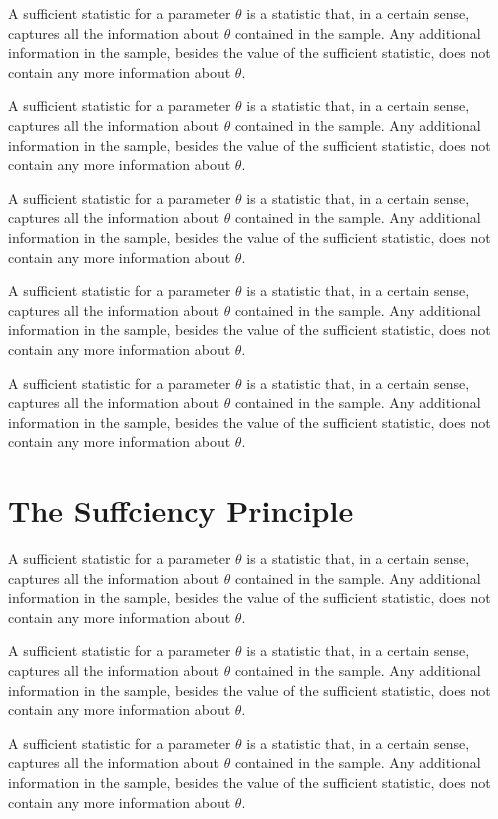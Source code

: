 A sufficient statistic for a parameter $\theta$ is a statistic that, in a certain sense, captures all the information about $\theta$ contained in the sample. Any additional information in the sample, besides the value of the sufficient statistic, does not contain any more information about $\theta$.

A sufficient statistic for a parameter $\theta$ is a statistic that, in a certain sense, captures all the information about $\theta$ contained in the sample. Any additional information in the sample, besides the value of the sufficient statistic, does not contain any more information about $\theta$.

A sufficient statistic for a parameter $\theta$ is a statistic that, in a certain sense, captures all the information about $\theta$ contained in the sample. Any additional information in the sample, besides the value of the sufficient statistic, does not contain any more information about $\theta$.

A sufficient statistic for a parameter $\theta$ is a statistic that, in a certain sense, captures all the information about $\theta$ contained in the sample. Any additional information in the sample, besides the value of the sufficient statistic, does not contain any more information about $\theta$.

A sufficient statistic for a parameter $\theta$ is a statistic that, in a certain sense, captures all the information about $\theta$ contained in the sample. Any additional information in the sample, besides the value of the sufficient statistic, does not contain any more information about $\theta$.
\section{The Suffciency Principle}

A sufficient statistic for a parameter $\theta$ is a statistic that, in a certain sense, captures all the information about $\theta$ contained in the sample. Any additional information in the sample, besides the value of the sufficient statistic, does not contain any more information about $\theta$.

A sufficient statistic for a parameter $\theta$ is a statistic that, in a certain sense, captures all the information about $\theta$ contained in the sample. Any additional information in the sample, besides the value of the sufficient statistic, does not contain any more information about $\theta$.

A sufficient statistic for a parameter $\theta$ is a statistic that, in a certain sense, captures all the information about $\theta$ contained in the sample. Any additional information in the sample, besides the value of the sufficient statistic, does not contain any more information about $\theta$.

